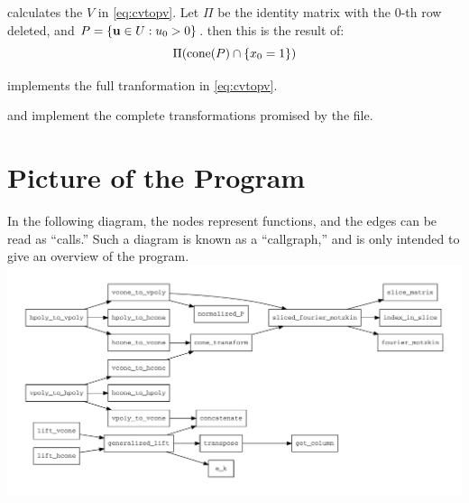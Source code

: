  calculates the $V$ in \eqref{eq:cvtopv}.  Let $\Pi$ be the identity matrix with the $0$-th row deleted, and $P = \left\{\mathbf{u} \in U : u_0 > 0\right\}$. then this is the result of:
\[ \Pi(\operatorname{cone}(P) \cap \left\{x_0 = 1\right\}) \]
\lstnormalizedP

 implements the full tranformation in \eqref{eq:cvtopv}.
\lstvconetovpoly

 and  implement the complete transformations promised by the file.
\lsthpolytovpoly
\lstvpolytohpoly

\section{Picture of the Program}
In the following diagram, the nodes represent functions, and the edges can be read as ``calls.''  Such a diagram is known as a ``callgraph,'' and is only intended to give an overview of the program.\\
\includegraphics[width=\textwidth]{../img/callgraph.pdf}

